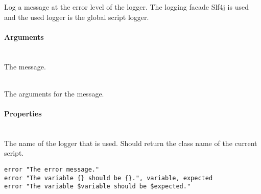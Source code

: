 %


Log a message at the error level of the logger.
The logging facade Slf4j\cite{slf4j13} is used and the used logger is
the global script logger.

\paragraph{Arguments}

\begin{asparadesc}
%
\item[\code{message}] \hfill \\
The message.
%
\item[\code{args}] \hfill \\
The arguments for the message.
%
\end{asparadesc}

\paragraph{Properties}

\begin{asparadesc}
%
\item[\code{name}] \hfill \\
The name of the logger that is used. Should return the class name of the current
script.
%
\end{asparadesc}

\begin{lstlisting}[style=Groovybash, label={lst:example_error}]
error "The error message."
error "The variable {} should be {}.", variable, expected
error "The variable $variable should be $expected."
\end{lstlisting}

